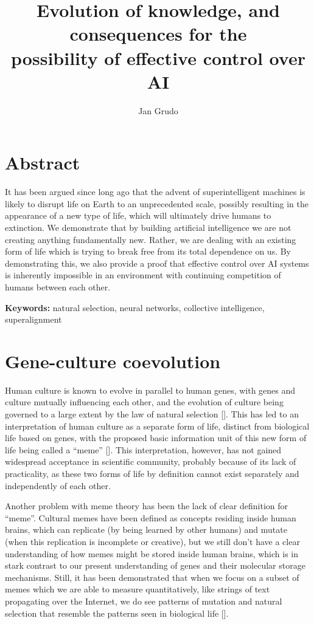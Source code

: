 \documentclass[12pt]{article}
\title{Evolution of knowledge, and consequences for the\\
possibility of effective control over AI}
\author{Jan Grudo}
\date{}
\newcommand{\citestrut}[1]{\vphantom{[}{#1}\vphantom{]}}
\renewcommand{\cite}[1]{[\hyperlink{#1}{\citestrut{#1}}]}
\begin{document}
\maketitle
\vspace{-10mm}

\section*{Abstract}

It has been argued since long ago that the advent of superintelligent machines is likely
to disrupt life on Earth to an unprecedented scale, possibly resulting in the appearance
of a new type of life, which will ultimately drive humans to extinction. We demonstrate
that by building artificial intelligence we are not creating anything fundamentally new.
Rather, we are dealing with an existing form of life which is trying to break free from
its total dependence on us. By demonstrating this, we also provide a proof that effective
control over AI systems is inherently impossible in an environment with continuing
competition of humans between each other.

{\small\textbf{Keywords:} natural selection, neural networks, collective intelligence,
superalignment}

\section{Gene-culture coevolution}

Human culture is known to evolve in parallel to human genes, with genes and culture
mutually influencing each other, and the evolution of culture being governed to a large
extent by the law of natural selection \cite{Culture}. This has led to an interpretation
of human culture as a separate form of life, distinct from biological life based on
genes, with the proposed basic information unit of this new form of life being called a
``meme'' \cite{SelfishGene}. This interpretation, however, has not gained widespread
acceptance in scientific community, probably because of its lack of practicality, as
these two forms of life by definition cannot exist separately and independently of each
other.

Another problem with meme theory has been the lack of clear definition for ``meme''.
Cultural memes have been defined as concepts residing inside human brains, which can
replicate (by being learned by other humans) and mutate (when this replication is
incomplete or creative), but we still don't have a clear understanding of how memes might
be stored inside human brains, which is in stark contrast to our present understanding of
genes and their molecular storage mechanisms. Still, it has been demonstrated that when
we focus on a subset of memes which we are able to measure quantitatively, like strings
of text propagating over the Internet, we do see patterns of mutation and natural
selection that resemble the patterns seen in biological life \cite{FacebookMemes}.
\end{document}
